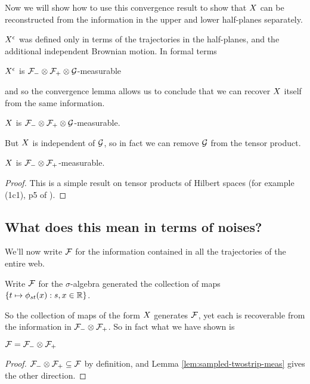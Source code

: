 {Now we will show how to use this convergence result to show that
$X$ can be reconstructed from the information in the upper and
lower half-planes separately.

$X^{\epsilon}$ was defined only in terms of the trajectories in the
half-planes, and the additional independent Brownian
motion.  In formal terms

\begin{obs}
  $X^{\epsilon}$ is $\mathcal{F}_{-} \otimes \mathcal{F}_{+} \otimes \mathcal{G}$-measurable
\end{obs}

and so the convergence lemma allows us to conclude that we can
recover $X$ itself from the same information.

\begin{cor}
  \label{cor:sampled-twostripsreservoir-meas}
  $X$ is $\mathcal{F}_{-} \otimes \mathcal{F}_{+} \otimes \mathcal{G}$-measurable.
\end{cor}
  
But $X$ is independent of $\mathcal{G}$, so in fact we can
remove $\mathcal{G}$ from the tensor product.

\begin{lemma}
  \label{lem:sampled-twostrip-meas}
  $X$ is $\mathcal{F}_{-} \otimes \mathcal{F}_{+}$-measurable.
\end{lemma}

\begin{proof}
  This is a simple result on tensor products of
  Hilbert spaces (for example (1c1), p5 of
  \cite{tsirelson-completion}).
\end{proof}

\subsection{What does this mean in terms of noises?}

We'll now write $\mathcal{F}$ for the information contained in all the
trajectories of the entire web.

\begin{definition}
  Write $\mathcal{F}$ for the $\sigma$-algebra generated the
  collection of maps $\{ t \mapsto \phi_{{s}{t}}(x) : s,x \in \mathbb{R} \}$.
\end{definition}

So the collection of maps of the form $X$ generates
$\mathcal{F}$, yet each is recoverable from the information in
$\mathcal{F}_{-} \otimes \mathcal{F}_{+}$.  So in fact what we have shown is

\begin{theorem}
  $\mathcal{F} = \mathcal{F}_{-} \otimes \mathcal{F}_{+}$
\end{theorem}

\begin{proof}
  $\mathcal{F}_{-} \otimes \mathcal{F}_{+} \subseteq \mathcal{F}$ by definition, and Lemma
  \ref{lem:sampled-twostrip-meas} gives the other direction.
\end{proof}
}
